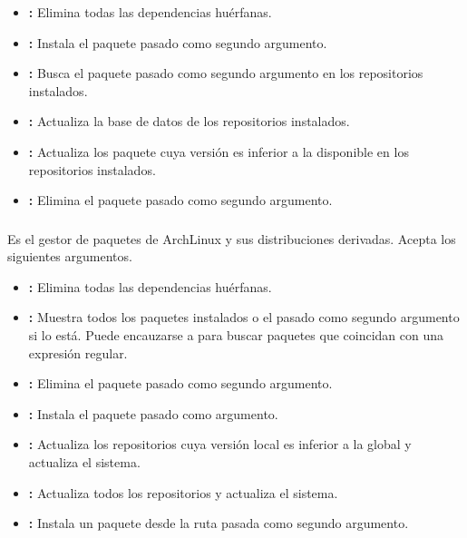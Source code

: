 \begin{itemize}
	\item{}\textbf{:} Elimina todas las dependencias huérfanas.
	\item{}\textbf{:} Instala el paquete pasado como segundo argumento.
	\item{}\textbf{:} Busca el paquete pasado como segundo argumento en los repositorios instalados.
	\item{}\textbf{:} Actualiza la base de datos de los repositorios instalados.
	\item{}\textbf{:} Actualiza los paquete cuya versión es inferior a la disponible en los repositorios instalados.
	\item{}\textbf{:} Elimina el paquete pasado como segundo argumento.
\end{itemize}

\subsubsection{}

Es el gestor de paquetes de ArchLinux y sus distribuciones derivadas.
Acepta los siguientes argumentos.

\begin{itemize}
	\item{}\textbf{:} Elimina todas las dependencias huérfanas.
	\item{}\textbf{:} Muestra todos los paquetes instalados o el pasado como segundo argumento si lo está. Puede encauzarse a  para buscar paquetes que coincidan con una expresión regular.
	\item{}\textbf{:} Elimina el paquete pasado como segundo argumento.
	\item{}\textbf{:} Instala el paquete pasado como argumento.
	\item{}\textbf{:} Actualiza los repositorios cuya versión local es inferior a la global y actualiza el sistema.
	\item{}\textbf{:} Actualiza todos los repositorios y actualiza el sistema.
	\item{}\textbf{:} Instala un paquete desde la ruta pasada como segundo argumento.
\end{itemize}

\subsubsection{}

